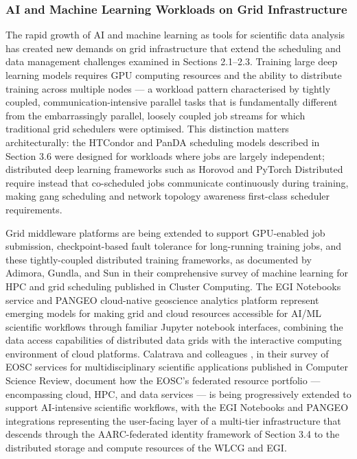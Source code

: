 \documentclass[12pt,a4paper]{report}
\begin{document}
\subsubsection{AI and Machine Learning Workloads on Grid Infrastructure}
The rapid growth of AI and machine learning as tools for scientific data analysis has created new demands on grid infrastructure that extend the 
scheduling and data management challenges examined in Sections 2.1–2.3. Training large deep learning models requires GPU computing resources and
 the ability to distribute training across multiple nodes — a workload pattern characterised by tightly coupled, communication-intensive parallel 
 tasks that is fundamentally different from the embarrassingly parallel, loosely coupled job streams for which traditional grid schedulers were optimised. 
 This distinction matters architecturally: the HTCondor and PanDA scheduling models described in Section 3.6 were designed for workloads where jobs are 
 largely independent; distributed deep learning frameworks such as Horovod and PyTorch Distributed require instead that co-scheduled jobs communicate 
 continuously during training, making gang scheduling and network topology awareness first-class scheduler requirements. 
 
 Grid middleware platforms are 
 being extended to support GPU-enabled job submission, checkpoint-based fault tolerance for long-running training jobs, and these tightly-coupled 
 distributed training frameworks, as documented by Adimora, Gundla, and Sun \parencite{adimora2025hpc} in their comprehensive survey of machine learning for HPC and 
 grid scheduling published in Cluster Computing. The EGI Notebooks service and PANGEO cloud-native geoscience analytics platform represent emerging 
 models for making grid and cloud resources accessible for AI/ML scientific workflows through familiar Jupyter notebook interfaces, combining the 
 data access capabilities of distributed data grids with the interactive computing environment of cloud platforms. Calatrava and colleagues \parencite{calatrava2023},
  in their survey of EOSC services for multidisciplinary scientific applications published in Computer Science Review, document how the EOSC’s 
  federated resource portfolio — encompassing cloud, HPC, and data services — is being progressively extended to support AI-intensive scientific 
  workflows, with the EGI Notebooks and PANGEO integrations representing the user-facing layer of a multi-tier infrastructure that descends through 
  the AARC-federated identity framework of Section 3.4 to the distributed storage and compute resources of the WLCG and EGI.
\end{document}
